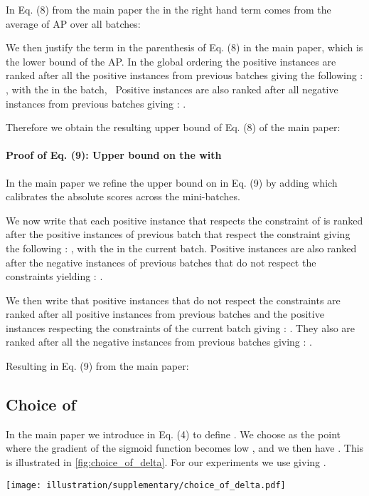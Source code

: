 In Eq. (8) from the main paper the  in the right hand term comes from the average of AP over all batches:


We then justify the term in the parenthesis of Eq. (8) in the main paper, which is the lower bound of the AP.
In the global ordering the positive instances are ranked after all the positive instances from previous batches giving the following : , with  the  in the batch, ~Positive instances are also ranked after all negative instances from previous batches giving : .

Therefore we obtain the resulting upper bound of Eq. (8) of the main paper:




\paragraph*{Proof of Eq. (9): Upper bound on the  with } In the main paper we refine the upper bound on  in Eq. (9) by adding  which calibrates the absolute scores across the mini-batches.

We now write that each positive instance that respects the constraint of  is ranked after the positive instances of previous batch that respect the constraint giving the following : , with  the  in the current batch. Positive instances are also ranked after the negative instances of previous batches that do not respect the constraints yielding  : .

We then write that positive instances that do not respect the constraints are ranked after all positive instances from previous batches and the positive instances respecting the constraints of the current batch giving  : . They also are ranked after all the negative instances from previous batches giving  : .


Resulting in Eq. (9) from the main paper:




\subsection{Choice of }

In the main paper we introduce  in Eq. (4) to define . We choose  as the point where the gradient of the sigmoid function becomes low , and we then have . This is illustrated in \cref{fig:choice_of_delta}. For our experiments we use  giving .


\begin{figure*}[t]
    \centering
    \texttt{[image: illustration/supplementary/choice\_of\_delta.pdf]}
    \caption{Gradient of the temperature scaled sigmoid () \vs the difference of scores  of a negative pair.}
    \label{fig:choice_of_delta}
\end{figure*}



